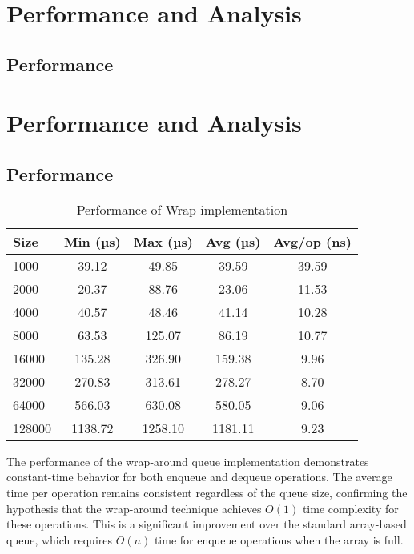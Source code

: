 \section*{Performance and Analysis}
\subsection*{Performance}
\section*{Performance and Analysis}
\subsection*{Performance}
\begin{table}[h]
    \centering
    \begin{tabular}{|l|c|c|c|c|}
    \hline
    \textbf{Size} & \textbf{Min (µs)} & \textbf{Max (µs)} & \textbf{Avg (µs)} & \textbf{Avg/op (ns)} \\
    \hline
    1000 & 39.12 & 49.85 & 39.59 & 39.59 \\
    2000 & 20.37 & 88.76 & 23.06 & 11.53 \\
    4000 & 40.57 & 48.46 & 41.14 & 10.28 \\
    8000 & 63.53 & 125.07 & 86.19 & 10.77 \\
    16000 & 135.28 & 326.90 & 159.38 & 9.96 \\
    32000 & 270.83 & 313.61 & 278.27 & 8.70 \\
    64000 & 566.03 & 630.08 & 580.05 & 9.06 \\
    128000 & 1138.72 & 1258.10 & 1181.11 & 9.23 \\
    \hline
    \end{tabular}
    \caption{Performance of Wrap implementation}
    \label{tab:wrap_perf}
\end{table}
The performance of the wrap-around queue implementation demonstrates constant-time behavior for both enqueue and dequeue operations. The average time per operation remains consistent regardless of the queue size, confirming the hypothesis that the wrap-around technique achieves $O(1)$ time complexity for these operations. This is a significant improvement over the standard array-based queue, which requires $O(n)$ time for enqueue operations when the array is full.

